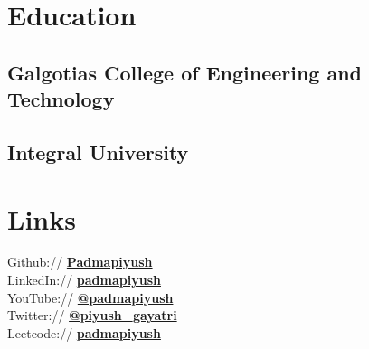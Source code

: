 \documentclass[]{deedy-resume-openfont}
\begin{document}
%
%
\lastupdated

%
%

%
%

\begin{minipage}[t]{0.33\textwidth} 


\section{Education} 

\subsection{Galgotias College of Engineering and Technology}
\sectionsep

\subsection{Integral University}
\sectionsep


\section{Links} 
Github:// \href{https://github.com/padmapiyush}{\bf Padmapiyush} \\
LinkedIn://  \href{https://www.linkedin.com/in/padmapiyush}{\bf padmapiyush} \\
YouTube://  \href{https://www.youtube.com/@padmapiyush}{\bf @padmapiyush} \\
Twitter://  \href{https://twitter.com/piyush_gayatri}{\bf @piyush\_gayatri}\\
Leetcode://  \href{https://leetcode.com/padmapiyush}{\bf padmapiyush}


\end{minipage}
\end{document}
